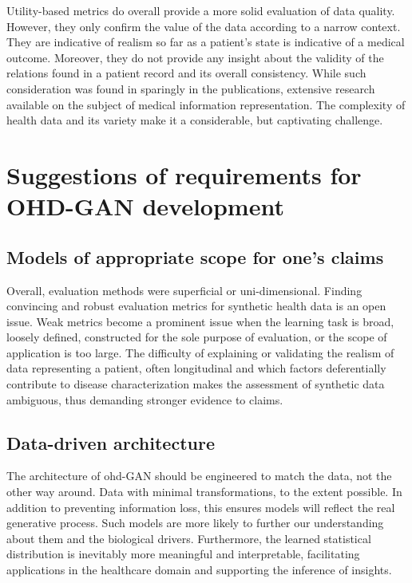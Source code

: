 Utility-based metrics do overall provide a more solid evaluation of data quality. However, they only confirm the value of the data according to a narrow context. They are indicative of realism so far as a patient's state is indicative of a medical outcome. Moreover, they do not provide any insight about the validity of the relations found in a patient record and its overall consistency. While such consideration was found in sparingly in the publications, extensive research available on the subject of medical information representation. The complexity of health data and its variety make it a considerable, but captivating challenge.\par

\section{Suggestions of requirements for OHD-GAN development}

\subsection{Models of appropriate scope for one's claims}\label{sec:basic}
Overall, evaluation methods were superficial or uni-dimensional. Finding convincing and robust evaluation metrics for synthetic health data is an open issue. Weak metrics become a prominent issue when the learning task is broad, loosely defined, constructed for the sole purpose of evaluation, or the scope of application is too large. The difficulty of explaining or validating the realism of data representing a patient, often longitudinal and which factors deferentially contribute to disease characterization makes the assessment of synthetic data ambiguous, thus demanding stronger evidence to claims.\par



\subsection{Data-driven architecture}\label{sec:archi}
The architecture of \gls{ohd}-GAN should be engineered to match the data, not the other way around. Data with minimal transformations, to the extent possible. In addition to preventing information loss, this ensures models will reflect the real generative process. Such models are more likely to further our understanding about them and the biological drivers. Furthermore, the learned statistical distribution is inevitably more meaningful and interpretable, facilitating applications in the healthcare domain and supporting the inference of insights.\par

